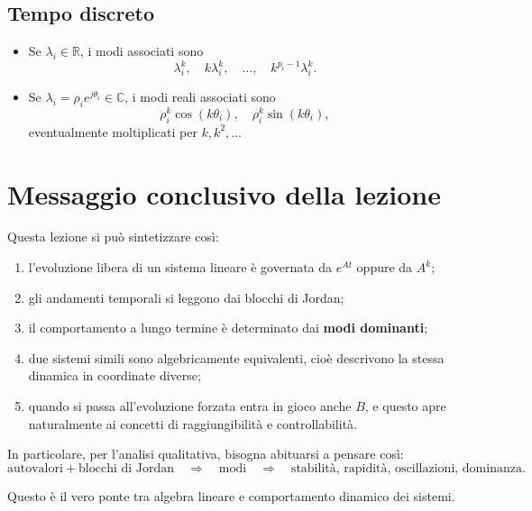 \subsection*{Tempo discreto}

\begin{itemize}
    \item Se $\lambda_i\in\mathbb{R}$, i modi associati sono
    \[
    \lambda_i^k,\quad
    k\lambda_i^k,\quad
    \dots,\quad
    k^{p_i-1}\lambda_i^k.
    \]
    \item Se $\lambda_i=\rho_i e^{j\theta_i}\in\mathbb{C}$, i modi reali associati sono
    \[
    \rho_i^k\cos(k\theta_i),\quad
    \rho_i^k\sin(k\theta_i),
    \]
    eventualmente moltiplicati per $k, k^2,\dots$
\end{itemize}

\section{Messaggio conclusivo della lezione}

Questa lezione si può sintetizzare così:

\begin{enumerate}
    \item l'evoluzione libera di un sistema lineare è governata da $e^{At}$ oppure da $A^k$;
    \item gli andamenti temporali si leggono dai blocchi di Jordan;
    \item il comportamento a lungo termine è determinato dai \textbf{modi dominanti};
    \item due sistemi simili sono algebricamente equivalenti, cioè descrivono la stessa dinamica in coordinate diverse;
    \item quando si passa all'evoluzione forzata entra in gioco anche $B$, e questo apre naturalmente ai concetti di raggiungibilità e controllabilità.
\end{enumerate}

In particolare, per l'analisi qualitativa, bisogna abituarsi a pensare così:
\[
\text{autovalori} + \text{blocchi di Jordan}
\quad \Longrightarrow \quad
\text{modi}
\quad \Longrightarrow \quad
\text{stabilità, rapidità, oscillazioni, dominanza}.
\]

Questo è il vero ponte tra algebra lineare e comportamento dinamico dei sistemi.